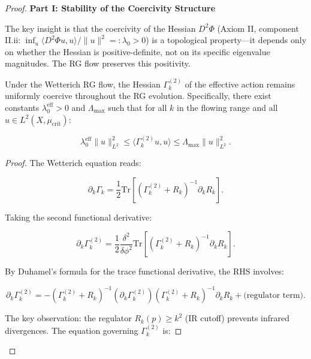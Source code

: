 \begin{proof}

\noindent\textbf{Part I: Stability of the Coercivity Structure}

The key insight is that the coercivity of the Hessian $D^2\Phi$ (Axiom II, component II.ii: $\inf_u \langle D^2\Phi u, u \rangle / \|u\|^2 =: \lambda_0 > 0$) is a topological property—it depends only on whether the Hessian is positive-definite, not on its specific eigenvalue magnitudes. The RG flow preserves this positivity.

\begin{lemma}
\label{lem:hessianPositivityPreservation}

Under the Wetterich RG flow, the Hessian $\Gamma_k^{(2)}$ of the effective action remains uniformly coercive throughout the RG evolution. Specifically, there exist constants $\lambda_0^{\mathrm{eff}} > 0$ and $\Lambda_{\max}$ such that for all $k$ in the flowing range and all $u \in L^2(X, \mu_{\mathrm{crit}})$:

\begin{equation}
\lambda_0^{\mathrm{eff}} \|u\|_{L^2}^2 \leq \langle \Gamma_k^{(2)} u, u \rangle \leq \Lambda_{\max} \|u\|_{L^2}^2.
\end{equation}

\begin{proof}

The Wetterich equation reads:

\begin{equation}
\partial_k \Gamma_k = \frac{1}{2} \mathrm{Tr}\left[(\Gamma_k^{(2)} + R_k)^{-1} \partial_k R_k\right].
\end{equation}

Taking the second functional derivative:

\begin{equation}
\partial_k \Gamma_k^{(2)} = \frac{1}{2} \frac{\delta^2}{\delta \phi^2} \mathrm{Tr}\left[(\Gamma_k^{(2)} + R_k)^{-1} \partial_k R_k\right].
\end{equation}

By Duhamel's formula for the trace functional derivative, the RHS involves:

\begin{equation}
\partial_k \Gamma_k^{(2)} = -(\Gamma_k^{(2)} + R_k)^{-1} (\partial_k \Gamma_k^{(2)}) (\Gamma_k^{(2)} + R_k)^{-1} \partial_k R_k + \text{(regulator term)}.
\end{equation}

The key observation: the regulator $R_k(p) \geq k^2$ (IR cutoff) prevents infrared divergences. The equation governing $\Gamma_k^{(2)}$ is:


\end{proof}
\end{lemma}
\end{proof}
